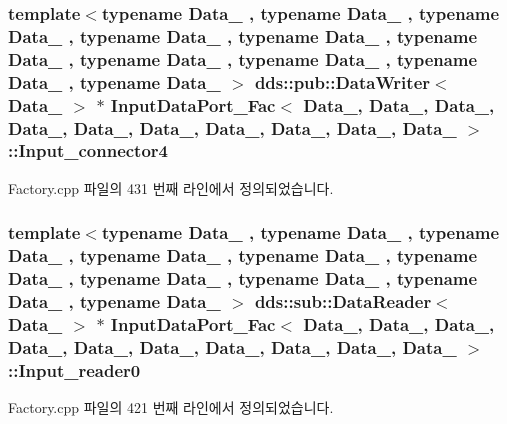 \subsubsection[{\texorpdfstring{Input\+\_\+connector4}{Input_connector4}}]{\setlength{\rightskip}{0pt plus 5cm}template$<$typename Data\+\_ , typename Data\+\_ , typename Data\+\_ , typename Data\+\_ , typename Data\+\_ , typename Data\+\_ , typename Data\+\_ , typename Data\+\_ , typename Data\+\_ , typename Data\+\_ $>$ dds\+::pub\+::\+Data\+Writer$<$ Data\+\_ $>$ $\ast$ {\bf Input\+Data\+Port\+\_\+\+Fac}$<$ Data\+\_, Data\+\_, Data\+\_, Data\+\_, Data\+\_, Data\+\_, Data\+\_, Data\+\_, Data\+\_, Data\+\_ $>$\+::Input\+\_\+connector4}\hypertarget{classInputDataPort__Fac_a67ee8b26e5d0195ddb518e1bc704112b}{}\label{classInputDataPort__Fac_a67ee8b26e5d0195ddb518e1bc704112b}


Factory.\+cpp 파일의 431 번째 라인에서 정의되었습니다.

\subsubsection[{\texorpdfstring{Input\+\_\+reader0}{Input_reader0}}]{\setlength{\rightskip}{0pt plus 5cm}template$<$typename Data\+\_ , typename Data\+\_ , typename Data\+\_ , typename Data\+\_ , typename Data\+\_ , typename Data\+\_ , typename Data\+\_ , typename Data\+\_ , typename Data\+\_ , typename Data\+\_ $>$ dds\+::sub\+::\+Data\+Reader$<$ Data\+\_ $>$ $\ast$ {\bf Input\+Data\+Port\+\_\+\+Fac}$<$ Data\+\_, Data\+\_, Data\+\_, Data\+\_, Data\+\_, Data\+\_, Data\+\_, Data\+\_, Data\+\_, Data\+\_ $>$\+::Input\+\_\+reader0}\hypertarget{classInputDataPort__Fac_ad4336e1795b30d34b8fc78209405173c}{}\label{classInputDataPort__Fac_ad4336e1795b30d34b8fc78209405173c}


Factory.\+cpp 파일의 421 번째 라인에서 정의되었습니다.

